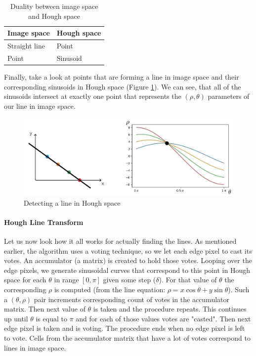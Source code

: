 \begin{table}[H]
	\centering
	\begin{spacing}{1.5}
	\begin{tabular}{|l|l|}
		\hline
		\textbf{Image space} & \textbf{Hough space} \\ [0.5ex]
		\hline
		Straight line & Point \\ [0.5ex]
		\hline
		Point & Sinusoid \\ [0.5ex]
		\hline
	\end{tabular}
	\end{spacing}
	\caption{Duality between image space and Hough space}
\end{table}
Finally, take a look at points that are forming a line in image space and their corresponding sinusoids in Hough space (Figure \ref{fig:line_detection_in_hough_space}). We can see, that all of the sinusoids intersect at exactly one point that represents the $(\rho, \theta)$ parameters of our line in image space.
\begin{figure}[H]
	\centering
	\includegraphics[width=\textwidth]{images/points_to_sinusoids}
	\caption{Detecting a line in Hough space}
	\label{fig:line_detection_in_hough_space}
\end{figure}

\paragraph{Hough Line Transform}
Let us now look how it all works for actually finding the lines. As mentioned earlier, the algorithm uses a voting technique, so we let each edge pixel to cast its votes. An accumulator (a matrix) is created to hold those votes. Looping over the edge pixels, we generate sinusoidal curves that correspond to this point in Hough space for each $\theta$ in range $[0, \pi]$ given some step ($\delta$). For that value of $\theta$ the corresponding $\rho$ is computed (from the line equation: $\rho = x\cos\theta + y\sin\theta$). Such a $(\theta, \rho)$ pair increments corresponding count of votes in the accumulator matrix. Then next value of $\theta$ is taken and the procedure repeats. This continues up until $\theta$ is equal to $\pi$  and for each of those values votes are "casted". Then next edge pixel is taken and is voting. The procedure ends when no edge pixel is left to vote. Cells from the accumulator matrix that have a lot of votes correspond to lines in image space.

